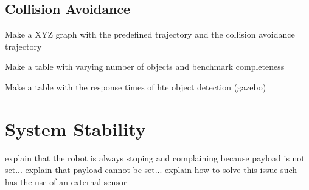 \subsection{Collision Avoidance}
\label{sec:colision_tests}

\par Make a XYZ graph with the predefined trajectory and the collision avoidance trajectory
\par Make a table with varying number of objects and benchmark completeness
\par Make a table with the response times of hte object detection (gazebo)

\section{System Stability}

\par explain that the robot is always stoping and complaining because payload is not set... explain that payload cannot be set... explain how to solve this issue such has the use of an external sensor